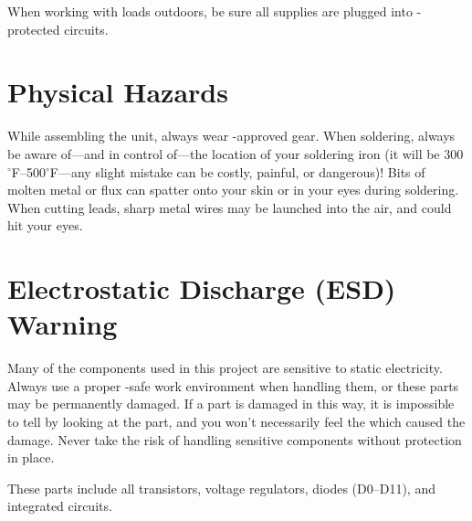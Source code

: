 When working with loads outdoors, be sure all supplies are plugged into -protected
circuits.

\section{Physical Hazards}
While assembling the unit, always wear -approved  gear.  When soldering,
always be aware of---and in control of---the location of your soldering iron (it will be 300$^\circ$F--500$^\circ$F---any slight 
mistake can be costly, painful, or dangerous)! Bits of molten metal or flux can spatter onto your
skin or in your eyes during soldering.  When cutting leads, sharp metal wires may be launched into the
air, and could hit your eyes.

\section{Electrostatic Discharge (ESD) Warning}
Many of the components used in this project are sensitive to static electricity.  Always use a proper
-safe work environment when handling them, or these parts may be permanently damaged.  If
a part is damaged in this way, 
it is impossible to tell by looking at the part, and you won't necessarily
feel the  which caused the damage.  Never take the risk of handling sensitive components
without  protection in place.

These parts include all transistors, voltage regulators, diodes (D0--D11),
and integrated circuits.
